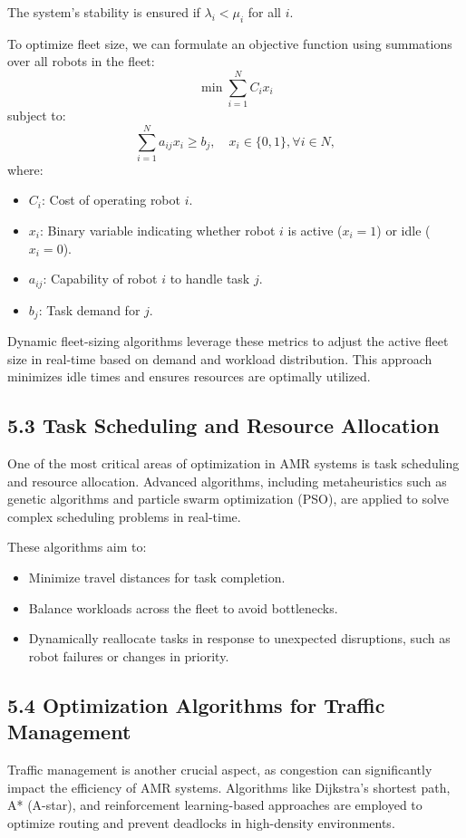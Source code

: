 \documentclass[conference]{IEEEtran}
\begin{document}
The system's stability is ensured if \( \lambda_i < \mu_i \) for all \( i \). 

To optimize fleet size, we can formulate an objective function using summations over all robots in the fleet:
\[
\min \sum_{i=1}^{N} C_i x_i
\]
subject to:
\[
\sum_{i=1}^{N} a_{ij} x_i \geq b_j, \quad x_i \in \{0, 1\}, \forall i \in N,
\]
where:
\begin{itemize}
    \item \( C_i \): Cost of operating robot \( i \).
    \item \( x_i \): Binary variable indicating whether robot \( i \) is active (\( x_i = 1 \)) or idle (\( x_i = 0 \)).
    \item \( a_{ij} \): Capability of robot \( i \) to handle task \( j \).
    \item \( b_j \): Task demand for \( j \).
\end{itemize}

Dynamic fleet-sizing algorithms leverage these metrics to adjust the active fleet size in real-time based on demand and workload distribution. This approach minimizes idle times and ensures resources are optimally utilized.

\subsection*{\textbf{5.3 Task Scheduling and Resource Allocation}}
One of the most critical areas of optimization in AMR systems is task scheduling and resource allocation. Advanced algorithms, including metaheuristics such as genetic algorithms and particle swarm optimization (PSO), are applied to solve complex scheduling problems in real-time.

These algorithms aim to:
\begin{itemize}
    \item Minimize travel distances for task completion.
    \item Balance workloads across the fleet to avoid bottlenecks.
    \item Dynamically reallocate tasks in response to unexpected disruptions, such as robot failures or changes in priority.
\end{itemize}

\subsection*{\textbf{5.4 Optimization Algorithms for Traffic Management}}
Traffic management is another crucial aspect, as congestion can significantly impact the efficiency of AMR systems. Algorithms like Dijkstra’s shortest path, A* (A-star), and reinforcement learning-based approaches are employed to optimize routing and prevent deadlocks in high-density environments.
\end{document}
